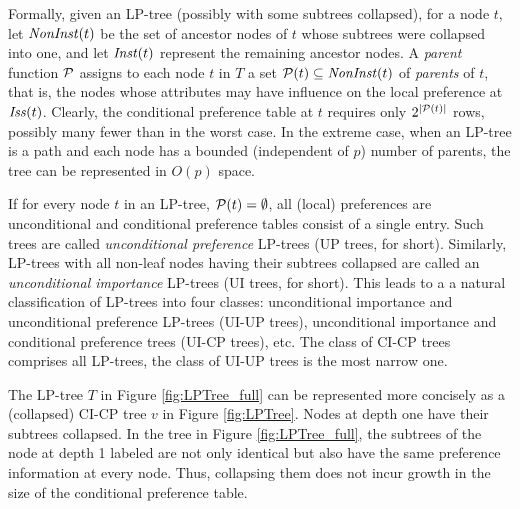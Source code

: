 Formally, given an LP-tree (possibly with some subtrees collapsed), for 
a node $t$, let $\mathit{NonInst}(t)$ be the set of ancestor nodes of $t$ whose
subtrees were collapsed into one, and let $\mathit{Inst}(t)$ represent the 
remaining ancestor nodes. A \emph{parent} function $\mathcal{P}$ assigns to 
each node $t$ in $T$ a set $\mathcal{P}(t)\subseteq\mathit{NonInst}(t)$ of \emph{parents}
of $t$, that is, the nodes whose attributes may have influence on the local 
preference at $\mathit{Iss}(t)$. Clearly, the conditional preference table at $t$
requires only $2^{|\mathcal{P}(t)|}$ rows, possibly many fewer than in the worst 
case. In the extreme case, when an LP-tree is a path and each node has 
a bounded (independent of $p$) number of parents, the tree can be 
represented in $O(p)$ space.

If for every node $t$ in an LP-tree, $\mathcal{P}(t)=\emptyset$, all (local)
preferences are unconditional and conditional preference tables consist
of a single entry. Such trees are called \emph{unconditional preference}
LP-trees (UP trees, for short). Similarly, LP-trees with all non-leaf 
nodes having their subtrees collapsed are called an \emph{unconditional
importance} LP-trees (UI trees, for short). This leads to a a natural 
classification of LP-trees into four classes: unconditional importance 
and unconditional preference LP-trees (UI-UP trees), unconditional 
importance and conditional preference trees (UI-CP trees), etc. The class
of CI-CP trees comprises all LP-trees, the class of UI-UP trees is the 
most narrow one. 

The LP-tree $T$ in Figure \ref{fig:LPTree_full} can be represented more
concisely as a (collapsed) CI-CP tree $v$ in Figure \ref{fig:LPTree}. Nodes
at depth one have their subtrees collapsed. In the tree in Figure
\ref{fig:LPTree_full}, the subtrees of the node at depth 1 labeled 
 are not only identical but also have the same preference 
information at every node. Thus, collapsing them does not incur growth in
the size of the conditional preference table.
      
